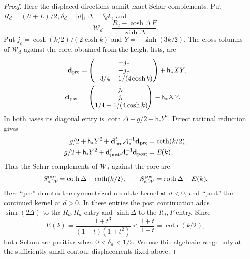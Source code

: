 \begin{proof}
Here the displaced directions admit exact Schur complements. Put
$R_d=(U+L)/2$, $\delta_d=|d|$, $\Delta=\delta_d k$, and
\[
 \mathcal W_d=\frac{R_d-\cosh\Delta\,F}{\sinh\Delta}.
\]
Put $j_c=\cosh(k/2)/(2\cosh k)$ and $Y=-\sinh(3k/2)$.
The cross columns of $\mathcal W_d$ against the core, obtained from the
height lists, are
\[
\begin{aligned}
 \mathbf d_{\rm pre}
 &=\begin{pmatrix}-j_c\\-j_c\\-3/4-1/(4\cosh k)\end{pmatrix}
       +\mathsf h_*XY,\\
 \mathbf d_{\rm post}
 &=\begin{pmatrix}j_c\\j_c\\1/4+1/(4\cosh k)\end{pmatrix}
       -\mathsf h_*XY.
\end{aligned}
\]
In both cases its diagonal entry is
$\coth\Delta-g/2-\mathsf h_*Y^2$. Direct rational reduction gives
\[
\begin{aligned}
 g/2+\mathsf h_*Y^2+
 \mathbf d_{\rm pre}^t\mathcal A_*^{-1}\mathbf d_{\rm pre}
 &=\coth(k/2),\\
 g/2+\mathsf h_*Y^2+
 \mathbf d_{\rm post}^t\mathcal A_*^{-1}\mathbf d_{\rm post}&=E(k).
\end{aligned}
\]
Thus the Schur complements of $\mathcal W_d$ against the core are
\begin{equation}\label{c7:one-species-even-schur}
 S_{e,\mathcal W}^{\rm pre}=\coth\Delta-\coth(k/2),\qquad
 S_{e,\mathcal W}^{\rm post}=\coth\Delta-E(k).
\end{equation}
Here ``pre'' denotes the symmetrized absolute kernel at $d<0$, and
``post'' the continued kernel at $d>0$. In these entries the post continuation adds
$\sinh(2\Delta)$ to the $R_d,R_d$ entry and $\sinh\Delta$ to the
$R_d,F$ entry. Since
\[
 E(k)=\frac{1+t^3}{(1-t)(1+t^2)}<\frac{1+t}{1-t}=\coth(k/2),
\]
both Schurs are positive when $0<\delta_d<1/2$. We use this algebraic
range only at the sufficiently small contour displacements fixed above.


\end{proof}
